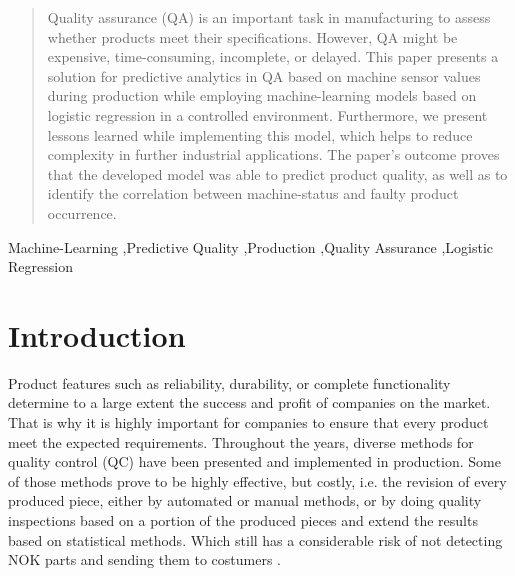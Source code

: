 \documentclass[5p,times,procedia]{elsarticle}
\begin{document}
\begin{frontmatter}
\begin{abstract}
Quality assurance (QA) is an important task in manufacturing to assess whether products 
meet their specifications. However, QA might be expensive, time-consuming, incomplete, or delayed.
This paper presents a solution for predictive analytics in QA based on machine sensor values during
production while employing machine-learning models based on logistic regression in a controlled environment. 
Furthermore, we present lessons learned while implementing this model, which helps to reduce complexity in
further industrial applications. The paper’s outcome proves that the developed model was able to predict
product quality, as well as to identify the correlation between machine-status and faulty product occurrence.
\end{abstract}

\begin{keyword}
Machine-Learning \sep Predictive Quality \sep Production \sep Quality Assurance \sep Logistic Regression 




\end{keyword}

\end{frontmatter}


\section{Introduction} %

Product features such as reliability, durability, or complete functionality determine to a large extent the success and profit of companies on the market. That is why it is highly important for companies to ensure that every product meet the expected requirements. Throughout the years, diverse methods for quality control (QC) have been presented and implemented in production. Some of those methods prove to be highly effective, but costly, i.e. the revision of every produced piece, either by automated or manual methods, or by doing quality inspections based on a portion of the produced pieces and extend the results based on statistical methods. Which still has a considerable risk of not detecting NOK parts and sending them to costumers \cite{mitra2016fundamentals, fox1993quality, kahle2013zuverlaessigkeitsanalyse}.
\end{document}
